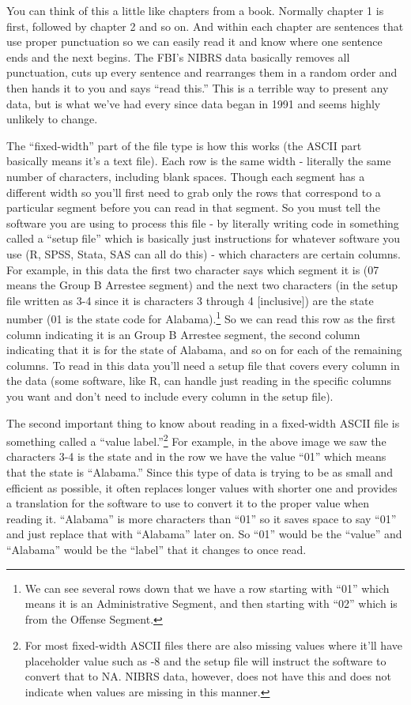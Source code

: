 \documentclass[
  12pt,
  openany]{book}
\begin{document}
You can think of this a little like chapters from a book. Normally chapter 1 is first, followed by chapter 2 and so on. And within each chapter are sentences that use proper punctuation so we can easily read it and know where one sentence ends and the next begins. The FBI's NIBRS data basically removes all punctuation, cuts up every sentence and rearranges them in a random order and then hands it to you and says ``read this.'' This is a terrible way to present any data, but is what we've had every since data began in 1991 and seems highly unlikely to change.

The ``fixed-width'' part of the file type is how this works (the ASCII part basically means it's a text file). Each row is the same width - literally the same number of characters, including blank spaces. Though each segment has a different width so you'll first need to grab only the rows that correspond to a particular segment before you can read in that segment. So you must tell the software you are using to process this file - by literally writing code in something called a ``setup file'' which is basically just instructions for whatever software you use (R, SPSS, Stata, SAS can all do this) - which characters are certain columns. For example, in this data the first two character says which segment it is (07 means the Group B Arrestee segment) and the next two characters (in the setup file written as 3-4 since it is characters 3 through 4 {[}inclusive{]}) are the state number (01 is the state code for Alabama).\footnote{We can see several rows down that we have a row starting with ``01'' which means it is an Administrative Segment, and then starting with ``02'' which is from the Offense Segment.} So we can read this row as the first column indicating it is an Group B Arrestee segment, the second column indicating that it is for the state of Alabama, and so on for each of the remaining columns. To read in this data you'll need a setup file that covers every column in the data (some software, like R, can handle just reading in the specific columns you want and don't need to include every column in the setup file).

The second important thing to know about reading in a fixed-width ASCII file is something called a ``value label.''\footnote{For most fixed-width ASCII files there are also missing values where it'll have placeholder value such as -8 and the setup file will instruct the software to convert that to NA. NIBRS data, however, does not have this and does not indicate when values are missing in this manner.} For example, in the above image we saw the characters 3-4 is the state and in the row we have the value ``01'' which means that the state is ``Alabama.'' Since this type of data is trying to be as small and efficient as possible, it often replaces longer values with shorter one and provides a translation for the software to use to convert it to the proper value when reading it. ``Alabama'' is more characters than ``01'' so it saves space to say ``01'' and just replace that with ``Alabama'' later on. So ``01'' would be the ``value'' and ``Alabama'' would be the ``label'' that it changes to once read.
\end{document}
